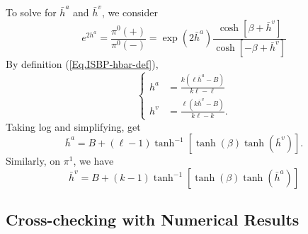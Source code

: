\documentclass[12pt]{article}
\numberwithin{equation}{section}
\begin{document}
To solve for $\bar{h}^a$ and $\bar{h}^v$, we consider
\begin{equation*}
    e^{2h^a} = \frac{\pi^0(+)}{\pi^0(-)} = \exp(2\bar{h}^a) \frac{\cosh\left[\beta+\bar{h}^v\right]}{\cosh\left[-\beta+\bar{h}^v\right]}
\end{equation*}
By definition (\ref{Eq.ISBP-hbar-def}),
\begin{equation*}
    \begin{cases}
        h^a & = \displaystyle\frac{k(\ell\bar{h}^a - B)}{k\ell - \ell} \\
        h^v & = \displaystyle\frac{\ell(k\bar{h}^v - B)}{k\ell - k}.
    \end{cases}
\end{equation*}
Taking log and simplifying, get
\begin{equation}
    \bar{h}^a = B + (\ell - 1)\tanh^{-1}[\tanh(\beta)\tanh(\bar{h}^v)].
    \label{Eq.ISBP-hbar-a}
\end{equation}
Similarly, on $\pi^1$, we have
\begin{equation}
    \bar{h}^v = B + (k - 1)\tanh^{-1}[\tanh(\beta)\tanh(\bar{h}^a)]
    \label{Eq.ISBP-hbar-v}
\end{equation}

\subsection{Cross-checking with Numerical Results}
\end{document}
